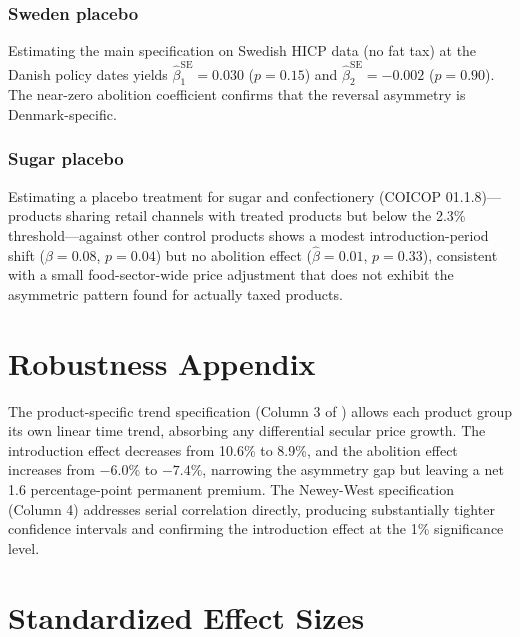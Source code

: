 \documentclass[12pt]{article}
\begin{document}
\subsubsection*{Sweden placebo} Estimating the main specification on Swedish HICP data (no fat tax) at the Danish policy dates yields $\hat{\beta}_1^{\text{SE}} = 0.030$ ($p = 0.15$) and $\hat{\beta}_2^{\text{SE}} = -0.002$ ($p = 0.90$). The near-zero abolition coefficient confirms that the reversal asymmetry is Denmark-specific.

\subsubsection*{Sugar placebo} Estimating a placebo treatment for sugar and confectionery (COICOP 01.1.8)---products sharing retail channels with treated products but below the 2.3\% threshold---against other control products shows a modest introduction-period shift ($\hat{\beta} = 0.08$, $p = 0.04$) but no abolition effect ($\hat{\beta} = 0.01$, $p = 0.33$), consistent with a small food-sector-wide price adjustment that does not exhibit the asymmetric pattern found for actually taxed products.

\section{Robustness Appendix}

The product-specific trend specification (Column 3 of ) allows each product group its own linear time trend, absorbing any differential secular price growth. The introduction effect decreases from 10.6\% to 8.9\%, and the abolition effect increases from $-6.0\%$ to $-7.4\%$, narrowing the asymmetry gap but leaving a net 1.6 percentage-point permanent premium. The Newey-West specification (Column 4) addresses serial correlation directly, producing substantially tighter confidence intervals and confirming the introduction effect at the 1\% significance level.

\section{Standardized Effect Sizes}
\label{sec:sde}


\end{document}
